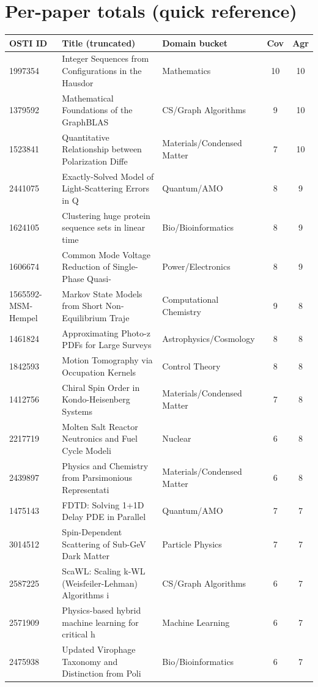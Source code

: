\documentclass[11pt]{article}
\begin{document}
\section{Per-paper totals (quick reference)}
\begin{longtable}{lllcc}
\toprule
OSTI ID & Title (truncated) & Domain bucket & Cov & Agr \\\midrule
\endhead
1997354 & Integer Sequences from Configurations in the Hausdor & Mathematics & 10 & 10 \\
1379592 & Mathematical Foundations of the GraphBLAS & CS/Graph Algorithms & 9 & 10 \\
1523841 & Quantitative Relationship between Polarization Diffe & Materials/Condensed Matter & 7 & 10 \\
2441075 & Exactly-Solved Model of Light-Scattering Errors in Q & Quantum/AMO & 8 & 9 \\
1624105 & Clustering huge protein sequence sets in linear time & Bio/Bioinformatics & 8 & 9 \\
1606674 & Common Mode Voltage Reduction of Single-Phase Quasi- & Power/Electronics & 8 & 9 \\
1565592-MSM-Hempel & Markov State Models from Short Non-Equilibrium Traje & Computational Chemistry & 9 & 8 \\
1461824 & Approximating Photo-z PDFs for Large Surveys & Astrophysics/Cosmology & 8 & 8 \\
1842593 & Motion Tomography via Occupation Kernels & Control Theory & 8 & 8 \\
1412756 & Chiral Spin Order in Kondo-Heisenberg Systems & Materials/Condensed Matter & 7 & 8 \\
2217719 & Molten Salt Reactor Neutronics and Fuel Cycle Modeli & Nuclear & 6 & 8 \\
2439897 & Physics and Chemistry from Parsimonious Representati & Materials/Condensed Matter & 6 & 8 \\
1475143 & FDTD: Solving 1+1D Delay PDE in Parallel & Quantum/AMO & 7 & 7 \\
3014512 & Spin-Dependent Scattering of Sub-GeV Dark Matter & Particle Physics & 7 & 7 \\
2587225 & ScaWL: Scaling k-WL (Weisfeiler-Lehman) Algorithms i & CS/Graph Algorithms & 6 & 7 \\
2571909 & Physics-based hybrid machine learning for critical h & Machine Learning & 6 & 7 \\
2475938 & Updated Virophage Taxonomy and Distinction from Poli & Bio/Bioinformatics & 6 & 7 \\

\end{longtable}
\end{document}
